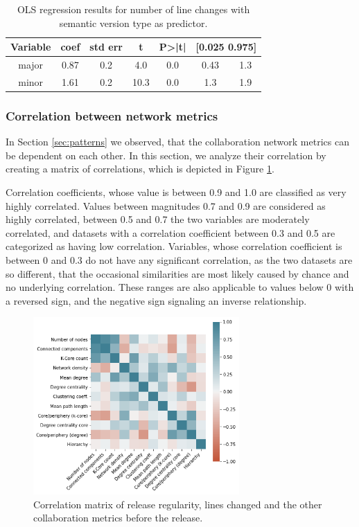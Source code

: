 \begin{table}
    \centering
        \begin{tabular}{|c|c|c|c|c|c|c|}
            \hline
            \textbf{Variable} & \textbf{coef} & \textbf{std err} & \textbf{t} & \textbf{P>|t|} & \multicolumn{2}{|c|}{\textbf{[0.025  0.975]}} \\
            \hline
            major & 0.87 & 0.2 & 4.0 & 0.0 & 0.43 & 1.3 \\
            minor & 1.61 & 0.2 & 10.3 & 0.0 & 1.3 & 1.9 \\
            \hline
        \end{tabular}
    \caption{OLS regression results for number of line changes with semantic version type as predictor.}
    \label{tab:linreg_lines}
\end{table}

\subsubsection{Correlation between network metrics}
In Section \ref{sec:patterns} we observed, that the collaboration network metrics can be dependent on each other. In this section, we analyze their correlation by creating a matrix of correlations, which is depicted in Figure \ref{fig:corr_matrix}.

Correlation coefficients, whose value is between 0.9 and 1.0 are classified as very highly correlated. Values between magnitudes 0.7 and 0.9 are considered as highly correlated, between 0.5 and 0.7 the two variables are moderately correlated, and datasets with a correlation coefficient between 0.3 and 0.5 are categorized as having low correlation. Variables, whose correlation coefficient is between 0 and 0.3 do not have any significant correlation, as the two datasets are so different, that the occasional similarities are most likely caused by chance and no underlying correlation. These ranges are also applicable to values below 0 with a reversed sign, and the negative sign signaling an inverse relationship.

\begin{figure}
    \centering
    \includegraphics[width=0.7\textwidth]{figures/quantitative/corr_matrix/corr_before.png}
    \caption{Correlation matrix of release regularity, lines changed and the other collaboration metrics before the release.}
    \label{fig:corr_matrix}
\end{figure}

